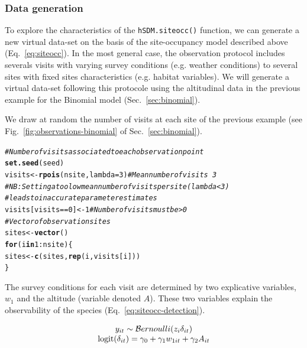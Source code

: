 \documentclass[a4paper, 12pt, leqno]{article}\usepackage[]{graphicx}\usepackage[]{color}
\makeatletter
\newcommand{\hlnum}[1]{\textcolor[rgb]{0.686,0.059,0.569}{#1}}%
\newcommand{\hlcom}[1]{\textcolor[rgb]{0.678,0.584,0.686}{\textit{#1}}}%
\newcommand{\hlopt}[1]{\textcolor[rgb]{0,0,0}{#1}}%
\newcommand{\hlstd}[1]{\textcolor[rgb]{0.345,0.345,0.345}{#1}}%
\newcommand{\hlkwa}[1]{\textcolor[rgb]{0.161,0.373,0.58}{\textbf{#1}}}%
\newcommand{\hlkwb}[1]{\textcolor[rgb]{0.69,0.353,0.396}{#1}}%
\newcommand{\hlkwc}[1]{\textcolor[rgb]{0.333,0.667,0.333}{#1}}%
\newcommand{\hlkwd}[1]{\textcolor[rgb]{0.737,0.353,0.396}{\textbf{#1}}}%
\newenvironment{kframe}{%
 \def\at@end@of@kframe{}%
 \ifinner\ifhmode%
  \def\at@end@of@kframe{\end{minipage}}%
  \begin{minipage}{\columnwidth}%
 \fi\fi%
 \def\FrameCommand##1{\hskip\@totalleftmargin \hskip-\fboxsep
 \colorbox{shadecolor}{##1}\hskip-\fboxsep
     \hskip-\linewidth \hskip-\@totalleftmargin \hskip\columnwidth}%
 \MakeFramed {\advance\hsize-\width
   \@totalleftmargin\z@ \linewidth\hsize
   \@setminipage}}%
 {\par\unskip\endMakeFramed%
 \at@end@of@kframe}
\newenvironment{knitrout}{}{} %
\newcommand{\logit}{\text{logit}}
\makeatother
\begin{document}
\subsubsection{Data generation}

To explore the characteristics of the \texttt{hSDM.siteocc()} function, we can generate a
new virtual data-set on the basis of the site-occupancy model described above
(Eq.~\ref{eq:siteocc}). In the most general case, the observation protocol includes severals
visits with varying survey conditions (e.g. weather conditions) to several sites with
fixed sites characteristics (e.g. habitat variables). We will generate a virtual data-set
following this protocole using the altitudinal data in the previous example for the
Binomial model (Sec.~\ref{sec:binomial}).

We draw at random the number of visits at each site of the previous example (see
Fig.~\ref{fig:observations-binomial} of Sec.~\ref{sec:binomial}).

\begin{knitrout}\small
{}\color{fgcolor}\begin{kframe}
\begin{alltt}
\hlcom{# Number of visits associated to each observation point}
\hlkwd{set.seed}\hlstd{(seed)}
\hlstd{visits} \hlkwb{<-} \hlkwd{rpois}\hlstd{(nsite,}\hlkwc{lambda}\hlstd{=}\hlnum{3}\hlstd{)} \hlcom{# Mean number of visits ~3}
\hlcom{# NB: Setting a too low mean number of visits per site (lambda < 3)}
\hlcom{# leads to inaccurate parameter estimates}
\hlstd{visits[visits}\hlopt{==}\hlnum{0}\hlstd{]} \hlkwb{<-} \hlnum{1} \hlcom{# Number of visits must be > 0}
\hlcom{# Vector of observation sites}
\hlstd{sites} \hlkwb{<-} \hlkwd{vector}\hlstd{()}
\hlkwa{for} \hlstd{(i} \hlkwa{in} \hlnum{1}\hlopt{:}\hlstd{nsite) \{}
    \hlstd{sites} \hlkwb{<-} \hlkwd{c}\hlstd{(sites,}\hlkwd{rep}\hlstd{(i,visits[i]))}
\hlstd{\}}
\end{alltt}
\end{kframe}
\end{knitrout}


The survey conditions for each visit are determined by two explicative variables, $w_1$
and the altitude (variable denoted $A$). These two variables explain the observability of
the species (Eq.~\ref{eq:siteocc-detection}).

\begin{equation}
  \begin{tabular}{c}
    $y_{it} \sim \mathcal{B}ernoulli(z_i \delta_{it})$ \\
    $\logit(\delta_{it}) = \gamma_0 + \gamma_1 w_{1it} + \gamma_2 A_{it}$ \\
  \end{tabular}
  \label{eq:siteocc-detection}
\end{equation}
\end{document}
